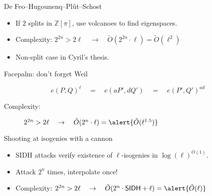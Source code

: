 \documentclass[12pt,aspectratio=169]{beamer}
\newcommand{\sm}[2]{\left(\protect\begin{matrix}#1\protect\\#2\protect\end{matrix}\right)}
\begin{document}

\begin{frame}{De Feo--Hugounenq--Plût--Schost} 
  \large\centering

  \bigskip

  \begin{itemize}
  \item If $2$ splits in $\mathbb{Z}[\pi]$, use volcanoes to find
    eigenspaces.
  \item Complexity: $2^{2n} > 2\ell \quad\to\quad \tilde{O}(2^{2n}\cdot \ell) = \tilde{O}(\ell^{2})$
  \item Non-split case in Cyril's thesis.
  \end{itemize}
\end{frame}


\begin{frame}{Facepalm: don't forget Weil}
  \large\centering

  
  \[e(P,Q)^\ell \quad=\quad e(aP',dQ') \quad=\quad e(P',Q')^{ad}\]
  
  \bigskip
  \begin{description}
  \item[Complexity:] $2^{2n} > 2\ell \quad\to\quad \tilde{O}(2^{n}\cdot\ell) = \alert{\tilde{O}(\ell^{1.5})}$
  \end{description}
\end{frame}


\begin{frame}{Shooting at isogenies with a cannon}
  \large\centering

  \bigskip
  
  \begin{itemize}
  \item SIDH attacks verify existence of $\ell$-isogenies in $\log(\ell)^{O(1)}$.
  \item Attack $2^n$ times, interpolate once!
  \item Complexity: $2^{2n} > 2\ell \quad\to\quad \tilde{O}(2^{n}\cdot\mathsf{SIDH} + \ell) = \alert{\tilde{O}(\ell)}$
  \end{itemize}
\end{frame}
\end{document}
